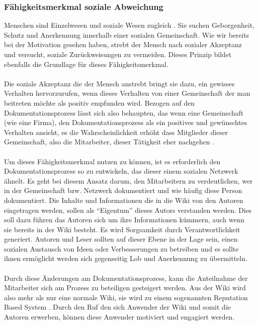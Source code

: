 \documentclass[a4paper,12pt]{scrartcl}
\begin{document}
\subsubsection{Fähigkeitsmerkmal soziale Abweichung}
Menschen sind Einzelwesen und soziale Wesen zugleich \cite{Vester2009}. Sie suchen Geborgenheit, Schutz und Anerkennung innerhalb einer sozialen Gemeinschaft. Wie wir bereits bei der Motivation gesehen haben, strebt der Mensch nach sozialer Akzeptanz und versucht, soziale Zurückweisungen zu vermeiden. Dieses Prinzip bildet ebenfalls die Grundlage für dieses Fähigkeitsmerkmal.
\\\\
Die soziale Akzeptanz die der Mensch anstrebt bringt sie dazu, ein gewisses Verhalten hervorzurufen, wenn dieses Verhalten von einer Gemeinschaft der man beitreten möchte als positiv empfunden wird. Bezogen auf den Dokumentationsprozess lässt sich also behaupten, das wenn eine Gemeinschaft (wie eine Firma), den Dokumentationsprozess als ein positives und gewünschtes Verhalten ansieht, es die Wahrscheinlichkeit erhöht dass Mitglieder dieser Gemeinschaft, also die Mitarbeiter, dieser Tätigkeit eher nachgehen \cite{Eyal2014}.
\\\\
Um dieses Fähigkeitsmerkmal nutzen zu können, ist es erforderlich den Dokumentationsprozess so zu entwickeln, das dieser einem sozialen Netzwerk ähnelt. Es geht bei diesem Ansatz darum, den Mitarbeitern zu verdeutlichen, wer in der Gemeinschaft bzw. Netzwerk dokumentiert und wie häufig diese Person dokumentiert. Die Inhalte und Informationen die in die Wiki von den Autoren eingetragen werden, sollen als “Eigentum” dieses Autors verstanden werden. Dies soll dazu führen das Autoren sich um ihre Informationen kümmern, auch wenn sie bereits in der Wiki besteht. Es wird Sorgsamkeit durch Verantwortlichkeit generiert. Autoren und Leser sollten auf dieser Ebene in der Lage sein, einen sozialen Austausch von Ideen oder Verbesserungen zu betreiben und es sollte ihnen ermöglicht werden sich gegenseitig Lob und Anerkennung zu übermitteln.
\\\\
Durch diese Änderungen am Dokumentationsprozess, kann die Anteilnahme der Mitarbeiter sich am Prozess zu beteiligen gesteigert werden. Aus der Wiki wird also mehr als nur eine normale Wiki, sie wird zu einem sogenannten Reputation Based System \cite{Prause2013}. Durch den Ruf den sich Anwender der Wiki und somit die Autoren erwerben, können diese Anwender motiviert und engagiert werden.
\end{document}
